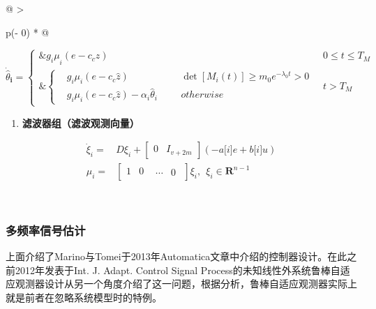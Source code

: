 \documentclass[
  12pt,
  a4paper
]{article}
\begin{document}
\begin{longtable}[]{@{}
  >{\raggedright\arraybackslash}p{}@{}}
\begin{minipage}[t]{\linewidth}
\[{\dot{\widehat{\theta}}}_{\mathbf{i}}\mathbf{=}\left\{ \begin{aligned}
\mathbf{\&}{g_{i}\mu}_{i}\left( e - c_{c}\widehat{z} \right) & 0 \leq t \leq T_{M} \\
\mathbf{\&}\left\{ \begin{array}{rlrlr}
 & g_{i}\mu_{i}\left( e - c_{c}\widehat{z} \right) & & & \det\left\lbrack M_{i}(t) \right\rbrack \geq m_{0}e^{- \lambda_{0}t} > 0 \\
 & g_{i}\mu_{i}\left( e - c_{c}\widehat{z} \right) - \alpha_{i}{\widehat{\theta}}_{i} & & & otherwise
\end{array} \right.\  & t > T_{M}
\end{aligned} \right.\ \]

\begin{enumerate}
\def\labelenumi{\arabic{enumi}.}
\setcounter{enumi}{2}
\item
  \textbf{滤波器组（滤波观测向量）}
\end{enumerate}

\[\begin{aligned}
{\dot{\xi}}_{i} = & D\xi_{i} + \begin{bmatrix}
0 & I_{v + 2m}
\end{bmatrix}\left( - a\lbrack i\rbrack e + b\lbrack i\rbrack u \right) \\
\mu_{i} = & \begin{bmatrix}
1 & 0 & \begin{matrix}
\cdots & 0
\end{matrix}
\end{bmatrix}\xi_{i},\ \ \xi_{i} \in \mathbf{R}^{n - 1}
\end{aligned}\]
\end{minipage} \\
\end{longtable}

\subsubsection{多频率信号估计}\label{ux591aux9891ux7387ux4fe1ux53f7ux4f30ux8ba1}

上面介绍了Marino与Tomei于2013年Automatica文章中介绍的控制器设计。在此之前2012年发表于Int.
J. Adapt. Control Signal
Process的未知线性外系统鲁棒自适应观测器设计从另一个角度介绍了这一问题，根据分析，鲁棒自适应观测器实际上就是前者在忽略系统模型时的特例。
\end{document}

